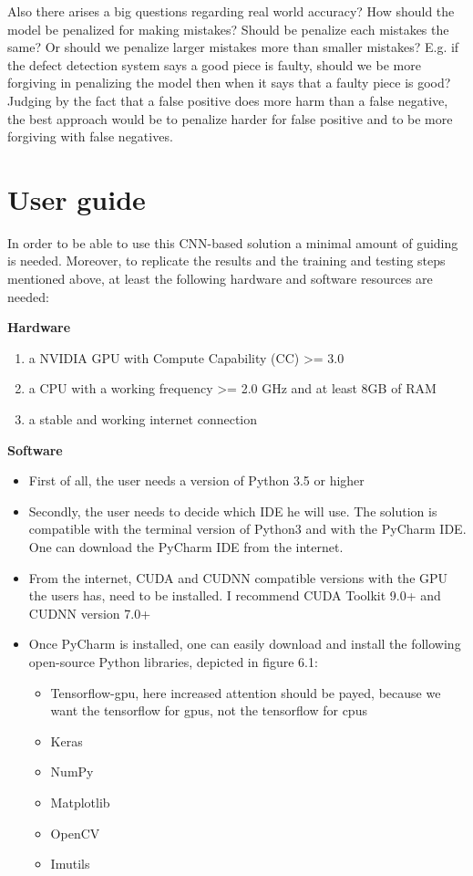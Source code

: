 \documentclass[12pt,a4paper,twoside]{report}
\begin{document}
Also there arises a big questions regarding real world accuracy? How should the model be penalized for making mistakes? Should be penalize each mistakes the same? Or should we penalize larger mistakes more than smaller mistakes? E.g. if the defect detection system says a good piece is faulty, should we be more forgiving in penalizing the model then when it says that a faulty piece is good? Judging by the fact that a false positive does more harm than a false negative, the best approach would be to penalize harder for false positive and to be more forgiving with false negatives.



\chapter{User guide}
\label{ch:guide}
In order to be able to use this CNN-based solution a minimal amount of guiding is needed. Moreover, to replicate the results and the training and testing steps mentioned above, at least the following hardware and software resources are needed:

\textbf{Hardware}
\begin{enumerate}
    \item a NVIDIA GPU with Compute Capability (CC) >= 3.0 
    \item a CPU with a working frequency >= 2.0 GHz and at least 8GB of RAM
    \item a stable and working internet connection
\end{enumerate}

\textbf{Software}
\begin{itemize}
    \item First of all, the user needs a version of Python 3.5 or higher
    \item Secondly, the user needs to decide which IDE he will use. The solution is compatible with the terminal version of Python3 and with the PyCharm IDE. One can download the PyCharm IDE from the internet.
    \item From the internet, CUDA and CUDNN compatible versions with the GPU the users has, need to be installed. I recommend CUDA Toolkit 9.0+ and CUDNN version 7.0+
    \item Once PyCharm is installed, one can easily download and install the following open-source Python libraries, depicted in figure 6.1:
    \begin{itemize}
        \item Tensorflow-gpu, here increased attention should be payed, because we want the tensorflow for gpus, not the tensorflow for cpus
        \item Keras 
        \item NumPy
        \item Matplotlib
        \item OpenCV
        \item Imutils
    \end{itemize}
\end{itemize}
\end{document}

